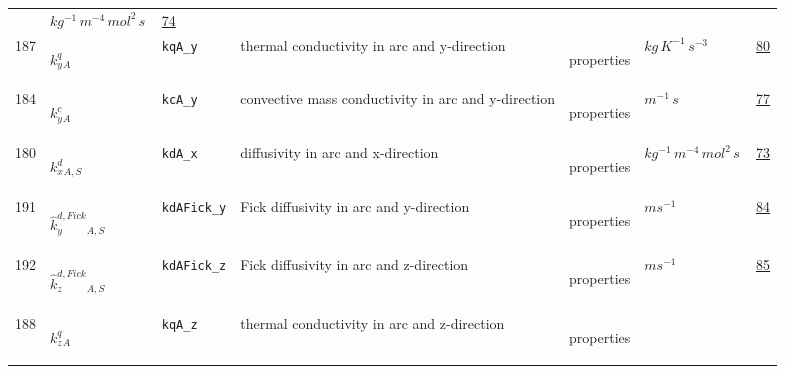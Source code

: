 \begin{longtable}{|p{1cm}|p{2.5cm}|p{4.5cm}|p{8cm}|p{3.0cm}|p{3cm}|p{1cm}|}
             & $ kg^{-1} \,m^{-4} \,mol^{2} \,s \, $
             &                 \hyperlink{"e:74"}{ 74 }
                 \\
            187
             & \hypertarget{"v:187"}{ $ {{k^q_y}}{_{A}} $}
             & \verb|kqA_y|
             & thermal conductivity in arc and y-direction
             & \begin{lay}properties \end{lay}
             & $ kg \,K^{-1} \,s^{-3} \, $
             &                 \hyperlink{"e:80"}{ 80 }
                 \\
            184
             & \hypertarget{"v:184"}{ $ {{k^c_y}}{_{A}} $}
             & \verb|kcA_y|
             & convective mass conductivity in arc and y-direction
             & \begin{lay}properties \end{lay}
             & $ m^{-1} \,s \, $
             &                 \hyperlink{"e:77"}{ 77 }
                 \\
            180
             & \hypertarget{"v:180"}{ $ {{k^d_x}}{_{A, S}} $}
             & \verb|kdA_x|
             & diffusivity in arc and x-direction
             & \begin{lay}properties \end{lay}
             & $ kg^{-1} \,m^{-4} \,mol^{2} \,s \, $
             &                 \hyperlink{"e:73"}{ 73 }
                 \\
            191
             & \hypertarget{"v:191"}{ $ {{\hat{k}^{d,Fick}_y}}{_{A, S}} $}
             & \verb|kdAFick_y|
             & Fick diffusivity in arc and y-direction
             & \begin{lay}properties \end{lay}
             & $ m s^{-1} \, $
             &                 \hyperlink{"e:84"}{ 84 }
                 \\
            192
             & \hypertarget{"v:192"}{ $ {{\hat{k}^{d,Fick}_z}}{_{A, S}} $}
             & \verb|kdAFick_z|
             & Fick diffusivity in arc and z-direction
             & \begin{lay}properties \end{lay}
             & $ m s^{-1} \, $
             &                 \hyperlink{"e:85"}{ 85 }
                 \\
            188
             & \hypertarget{"v:188"}{ $ {{k^q_z}}{_{A}} $}
             & \verb|kqA_z|
             & thermal conductivity in arc and z-direction
             & \begin{lay}properties \end{lay}

\end{longtable}
